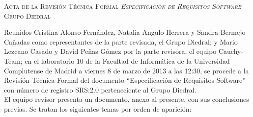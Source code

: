 \documentclass[twoside, a4paper, 11pt]{article}
\begin{document}
	\begin{center}
		\scshape \large Acta de la Revisión Técnica Formal \textit{Especificación de Requisitos Software} \\ Grupo Diedral \vspace{.5cm}
	\end{center}

	Reunidos Cristina Alonso Fernández, Natalia Angulo Herrera y Sandra Bermejo Cañadas como representantes de la parte revisada, el Grupo Diedral; y Mario Lezcano Casado y David Peñas Gómez por la parte revisora, el equipo Cauchy-Team; en el laboratorio 10 de la Facultad de Informática de la Universidad Complutense de Madrid a viernes 8 de marzo de 2013 a las 12:30, se procede a la Revisión Técnica Formal del documento ``Especificación de Requisitos Software'' con número de registro SRS:2.0 perteneciente al Grupo Diedral.\\

	El equipo revisor presenta un documento, anexo al presente, con sus conclusiones previas. Se tratan los siguientes temas por orden de aparición:
\end{document}
